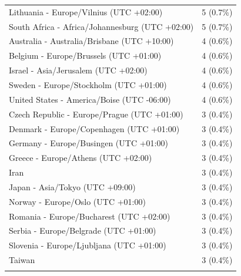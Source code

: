 \begin{appendix}
\begin{table}
{\begin{tabular}[t]{ll}
\hspace{1em}Lithuania - Europe/Vilnius (UTC +02:00) & 5 (0.7\%)\\
\hspace{1em}South Africa - Africa/Johannesburg (UTC +02:00) & 5 (0.7\%)\\
\hspace{1em}Australia - Australia/Brisbane (UTC +10:00) & 4 (0.6\%)\\
\addlinespace
\hspace{1em}Belgium - Europe/Brussels (UTC +01:00) & 4 (0.6\%)\\
\hspace{1em}Israel - Asia/Jerusalem (UTC +02:00) & 4 (0.6\%)\\
\hspace{1em}Sweden - Europe/Stockholm (UTC +01:00) & 4 (0.6\%)\\
\hspace{1em}United States - America/Boise (UTC -06:00) & 4 (0.6\%)\\
\hspace{1em}Czech Republic - Europe/Prague (UTC +01:00) & 3 (0.4\%)\\
\addlinespace
\hspace{1em}Denmark - Europe/Copenhagen (UTC +01:00) & 3 (0.4\%)\\
\hspace{1em}Germany - Europe/Busingen (UTC +01:00) & 3 (0.4\%)\\
\hspace{1em}Greece - Europe/Athens (UTC +02:00) & 3 (0.4\%)\\
\hspace{1em}Iran & 3 (0.4\%)\\
\hspace{1em}Japan - Asia/Tokyo (UTC +09:00) & 3 (0.4\%)\\
\addlinespace
\hspace{1em}Norway - Europe/Oslo (UTC +01:00) & 3 (0.4\%)\\
\hspace{1em}Romania - Europe/Bucharest (UTC +02:00) & 3 (0.4\%)\\
\hspace{1em}Serbia - Europe/Belgrade (UTC +01:00) & 3 (0.4\%)\\
\hspace{1em}Slovenia - Europe/Ljubljana (UTC +01:00) & 3 (0.4\%)\\
\hspace{1em}Taiwan & 3 (0.4\%)\\
\addlinespace

\end{tabular}}
\end{table}
\end{appendix}
